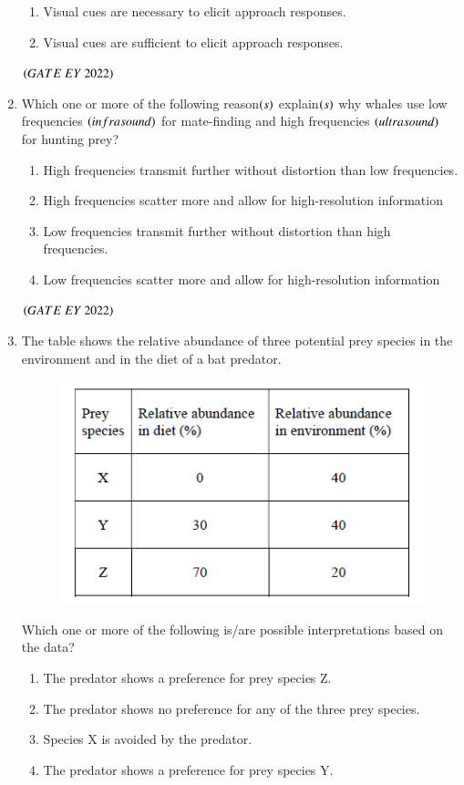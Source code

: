 \documentclass[journal]{IEEEtran}
\numberwithin{equation}{enumi}
\numberwithin{figure}{enumi}
\begin{document}
\begin{enumerate}
\begin{enumerate}
        \item  Visual cues are necessary to elicit approach responses.
        \item  Visual cues are sufficient to elicit approach responses.
    \end{enumerate}
    \hfill{$\brak{ GATE\ EY\ 2022}$}
    \bigskip
 \item Which one or more of the following reason$\left(s\right)$ explain$\left(s\right)$ why whales use low
frequencies $\left(infrasound\right)$ for mate-finding and high frequencies $\left(ultrasound\right)$
for hunting prey?
    \begin{enumerate}
        \item  High frequencies transmit further without distortion than low frequencies.
        \item  High frequencies scatter more and allow for high-resolution information
        \item  Low frequencies transmit further without distortion than high frequencies.
        \item  Low frequencies scatter more and allow for high-resolution information
    \end{enumerate}
    \hfill{$\brak{ GATE\ EY\ 2022}$}
    \bigskip
 \item The table shows the relative abundance of three potential prey species in the
environment and in the diet of a bat predator.
\begin{figure}[H]
    \centering
\includegraphics[width=0.5\columnwidth]{figs/16.png}
    \caption{}
    \label{fig:16}
   \end{figure}
Which one or more of the following is/are possible interpretations based on the data?
    \begin{enumerate}
        \item  The predator shows a preference for prey species Z.
        \item  The predator shows no preference for any of the three prey species.
        \item  Species X is avoided by the predator.
        \item  The predator shows a preference for prey species Y.

\end{enumerate}
\end{enumerate}
\end{document}
